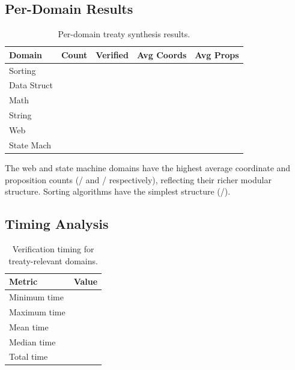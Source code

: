 \documentclass[11pt]{article}
\begin{document}
\subsection{Per-Domain Results}

\begin{table}[H]
\centering
\caption{Per-domain treaty synthesis results.}\label{tab:domains}
\begin{tabular}{@{}l r r r r@{}}
\toprule
\textbf{Domain} & \textbf{Count} & \textbf{Verified}
  & \textbf{Avg Coords} & \textbf{Avg Props} \\
\midrule
Sorting     & \expDomainSortCount{} & \expDomainSortVerified{}
  & \expDomainSortAvgCoords{} & \expDomainSortAvgProps{} \\
Data Struct & \expDomainDsCount{} & \expDomainDsVerified{}
  & \expDomainDsAvgCoords{} & \expDomainDsAvgProps{} \\
Math        & \expDomainMathCount{} & \expDomainMathVerified{}
  & \expDomainMathAvgCoords{} & \expDomainMathAvgProps{} \\
String      & \expDomainStrCount{} & \expDomainStrVerified{}
  & \expDomainStrAvgCoords{} & \expDomainStrAvgProps{} \\
Web         & \expDomainWebCount{} & \expDomainWebVerified{}
  & \expDomainWebAvgCoords{} & \expDomainWebAvgProps{} \\
State Mach  & \expDomainSmCount{} & \expDomainSmVerified{}
  & \expDomainSmAvgCoords{} & \expDomainSmAvgProps{} \\
\bottomrule
\end{tabular}
\end{table}

The web and state machine domains have the highest average coordinate
and proposition counts (\expDomainWebAvgCoords{}/\expDomainWebAvgProps{}
and \expDomainSmAvgCoords{}/\expDomainSmAvgProps{} respectively),
reflecting their richer modular structure.  Sorting algorithms have
the simplest structure (\expDomainSortAvgCoords{}/\expDomainSortAvgProps{}).

\subsection{Timing Analysis}

\begin{table}[H]
\centering
\caption{Verification timing for treaty-relevant domains.}\label{tab:timing}
\begin{tabular}{@{}l r@{}}
\toprule
\textbf{Metric} & \textbf{Value} \\
\midrule
Minimum time   & \expTimeMin{} \\
Maximum time   & \expTimeMax{} \\
Mean time      & \expTimeMean{} \\
Median time    & \expTimeMedian{} \\
Total time     & \expTimeTotal{} \\
\bottomrule
\end{tabular}
\end{table}
\end{document}
